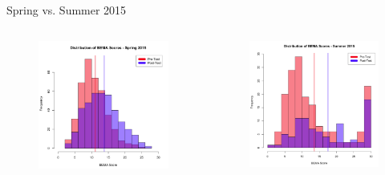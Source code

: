 \documentclass{beamer}
\begin{document}
\begin{frame}{Spring vs. Summer 2015}
\begin{columns}
\begin{column}{2in}
\begin{figure}
	\includegraphics[width=2in]{img/chapter4/bema_spring_2015}
\end{figure}
\end{column}
\begin{column}{2in}
\begin{figure}
	\includegraphics[width=2in]{img/chapter4/bema_summer_2015}
\end{figure}
\end{column}
\end{columns}
\end{frame}
\end{document}
